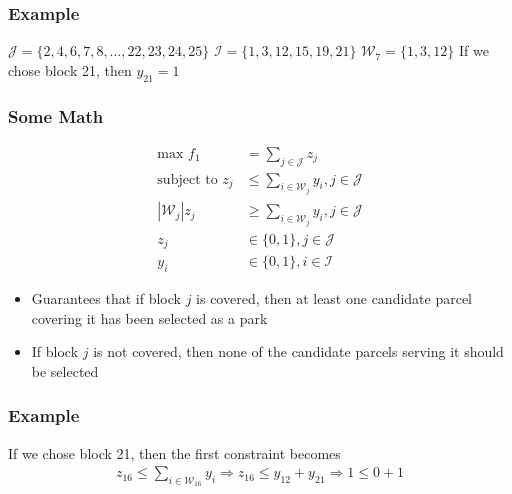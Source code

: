 \documentclass[10pt, compress]{beamer}
\begin{document}
\begin{frame}[fragile]
  \frametitle{Example}
  \begin{center}
\end{center}
$\mathcal{J} = \{2,4,6,7,8,\dots, 22,23,24,25\}$ \newline
$\mathcal{I} = \{1,3,12,15,19,21\}$ \newline
$\mathcal{W}_7 = \{1,3,12\}$ \newline
If we chose block 21, then $y_{21} = 1$ 
\end{frame}

\begin{frame}[fragile]
\frametitle{Some Math}
\begin{align*}
\textrm{max } f_1 &= \sum_{j \in \mathcal{J}} z_j \\
\textrm{subject to } z_j &\leq \sum_{i \in \mathcal{W}_j} y_i, j \in \mathcal{J}\\
\left|\mathcal{W}_j\right|z_j &\geq \sum_{i \in \mathcal{W}_j} y_i, j \in \mathcal{J} \\
z_j &\in \{0,1\}, j \in \mathcal{J} \\
y_i &\in \{0,1\}, i \in \mathcal{I}
\end{align*}
\begin{itemize}
\item Guarantees that if block $j$ is covered, then at least one candidate parcel covering it has been selected as a park
\item If block $j$ is not covered, then none of the candidate parcels serving it should be selected
\end{itemize}
\end{frame}

\begin{frame}[fragile]
  \frametitle{Example}
  \begin{center}
\end{center}
If we chose block 21, then the first constraint becomes \newline
\begin{align*}
z_{16} \leq \sum_{i \in \mathcal{W}_{16}} y_i 
\Rightarrow z_{16} \leq y_{12} + y_{21}
\Rightarrow 1 \leq 0 + 1 
\end{align*}
\end{frame}
\end{document}
